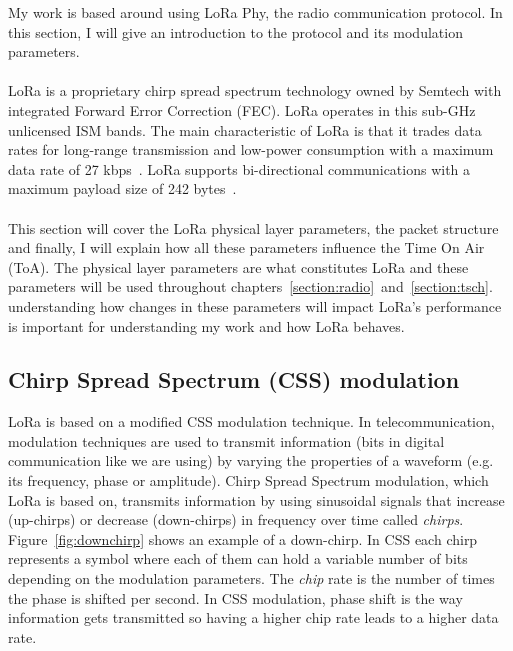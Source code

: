 My work is based around using LoRa Phy, the radio communication protocol.
In this section, I will give an introduction to the protocol and its
modulation parameters.

\paragraph{}

LoRa is a proprietary chirp spread spectrum technology owned by Semtech with
integrated Forward Error Correction (FEC).
LoRa operates in this sub-GHz unlicensed ISM bands. %
The main characteristic of LoRa is that it trades data rates for long-range
transmission and low-power consumption with a maximum data rate of
27 kbps~\cite{8030482}.
LoRa supports bi-directional communications with a maximum payload size of 242
bytes~\cite{loraalliance:lorawanspecification}.

\paragraph{}

This section will cover the LoRa physical layer parameters, the packet
structure and finally, I will explain how all these parameters influence the
Time On Air (ToA).
The physical layer parameters are what constitutes LoRa and these parameters
will be used throughout
chapters~\ref{section:radio}~and~\ref{section:tsch}.
understanding how changes in these parameters will impact LoRa's performance
is important for understanding my work and how LoRa behaves.

\subsection{Chirp Spread Spectrum (CSS) modulation}

LoRa is based on a modified CSS modulation technique.
In telecommunication, modulation techniques are used to transmit information (bits in digital communication like we are using)
by varying the properties of a waveform (e.g. its frequency, phase or amplitude).
Chirp Spread Spectrum modulation, which LoRa is based on, transmits information
by using sinusoidal signals that increase (up-chirps) or decrease (down-chirps)
in frequency over time called \emph{chirps}.
Figure~\ref{fig:downchirp} shows an example of a down-chirp.
In CSS each chirp represents a symbol where each of them can hold a variable number
of bits depending on the modulation parameters.
The \emph{chip} rate is the number of times the phase is shifted per second.
In CSS modulation, phase shift is the way information gets transmitted so having
a higher chip rate leads to a higher data rate.

